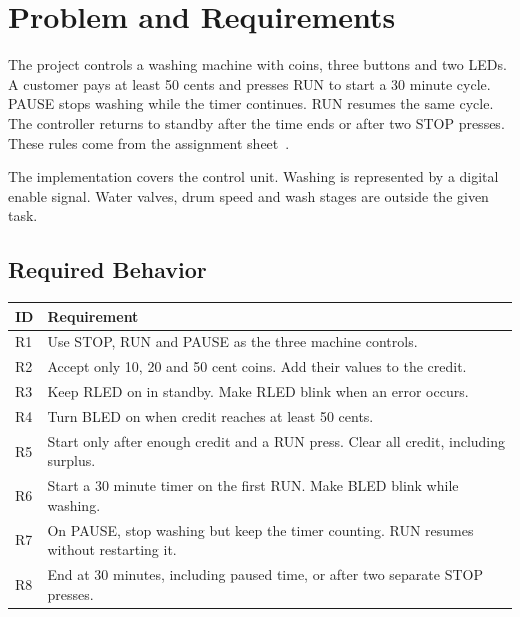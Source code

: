 \section{Problem and Requirements}
The project controls a washing machine with coins, three buttons and two LEDs.
A customer pays at least 50 cents and presses RUN to start a 30 minute cycle.
PAUSE stops washing while the timer continues. RUN resumes the same cycle.
The controller returns to standby after the time ends or after two STOP presses.
These rules come from the assignment sheet~\cite{brief}.

The implementation covers the control unit. Washing is represented by a digital
enable signal. Water valves, drum speed and wash stages are outside the given task.

\subsection{Required Behavior}
\begin{tabularx}{\linewidth}{@{}p{0.85cm}Y@{}}
\toprule
ID & Requirement\\
\midrule
R1 & Use STOP, RUN and PAUSE as the three machine controls.\\
R2 & Accept only 10, 20 and 50 cent coins. Add their values to the credit.\\
R3 & Keep RLED on in standby. Make RLED blink when an error occurs.\\
R4 & Turn BLED on when credit reaches at least 50 cents.\\
R5 & Start only after enough credit and a RUN press. Clear all credit, including surplus.\\
R6 & Start a 30 minute timer on the first RUN. Make BLED blink while washing.\\
R7 & On PAUSE, stop washing but keep the timer counting. RUN resumes without restarting it.\\
R8 & End at 30 minutes, including paused time, or after two separate STOP presses.\\
\bottomrule
\end{tabularx}

